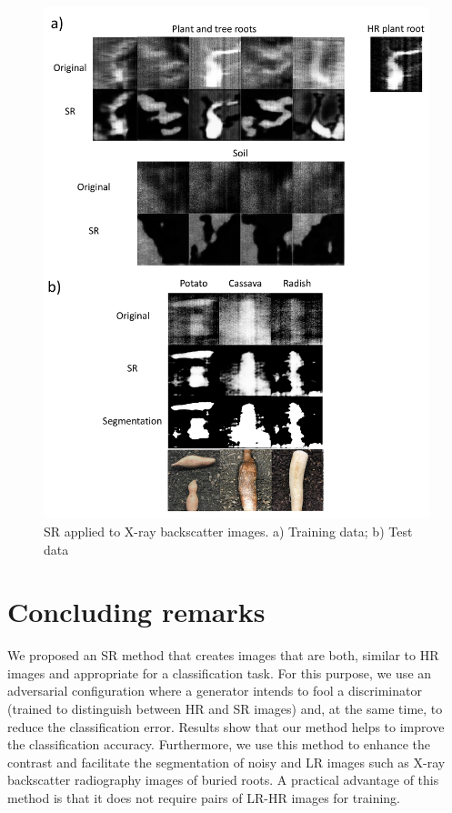 \documentclass[10pt,twocolumn,letterpaper]{article}
\begin{document}
\begin{figure}[h]
\begin{center}
\includegraphics[scale=0.60]{results/srxray.pdf}
\end{center}
   \caption{SR applied to X-ray backscatter images. a) Training data; b) Test data}
\label{fig:srtest}
\end{figure}

\section{Concluding remarks}
\label{sec:conclusion}

We proposed an SR method that creates images that are both, similar to HR images and appropriate for a classification task. For this purpose, we use an adversarial configuration where a generator intends to fool a discriminator (trained to distinguish between HR and SR images) and, at the same time, to reduce the classification error. Results show that our method helps to improve the classification accuracy. Furthermore, we use this method to enhance the contrast and facilitate the segmentation of noisy and LR images such as X-ray backscatter radiography images of buried roots. A practical advantage of this method is that it does not require pairs of LR-HR images for training.
\end{document}
